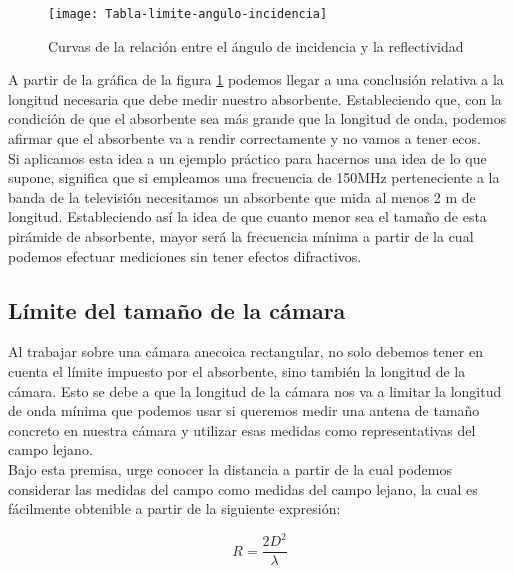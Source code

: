 \newpage

\begin{figure}
    \centering
    \texttt{[image: Tabla-limite-angulo-incidencia]}
    \caption{Curvas de la relación entre el ángulo de incidencia y la reflectividad}
    \label{Tabla-limite-angulo-incidencia}
\end{figure}

A partir de la gráfica de la figura \ref{Tabla-limite-angulo-incidencia} podemos llegar a una conclusión relativa a la longitud necesaria que debe medir nuestro absorbente. Estableciendo que, con la condición de que el absorbente sea más grande que la longitud de onda, podemos afirmar que el absorbente va a rendir correctamente y no vamos a tener ecos.
\\

Si aplicamos esta idea a un ejemplo práctico para hacernos una idea de lo que supone, significa que si empleamos una frecuencia de 150MHz perteneciente a la banda de la televisión necesitamos un absorbente que mida al menos 2 m de longitud. Estableciendo así la idea de que cuanto menor sea el tamaño de esta pirámide de absorbente, mayor será la frecuencia mínima a partir de la cual podemos efectuar mediciones sin tener efectos difractivos. 

\newpage

\subsection{Límite del tamaño de la cámara}

Al trabajar sobre una cámara anecoica rectangular, no solo debemos tener en cuenta el límite impuesto por el absorbente, sino también la longitud de la cámara. Esto se debe a que la longitud de la cámara nos va a limitar la longitud de onda mínima que podemos usar si queremos medir una antena de tamaño concreto en nuestra cámara y utilizar esas medidas como representativas del campo lejano.\\ 

Bajo esta premisa, urge conocer la distancia a partir de la cual podemos considerar las medidas del campo como medidas del campo lejano, la cual es fácilmente obtenible a partir de la siguiente expresión: 

                            \begin{equation}
                            R =\frac{2D^2}{\lambda}
                            \end{equation}
                       
